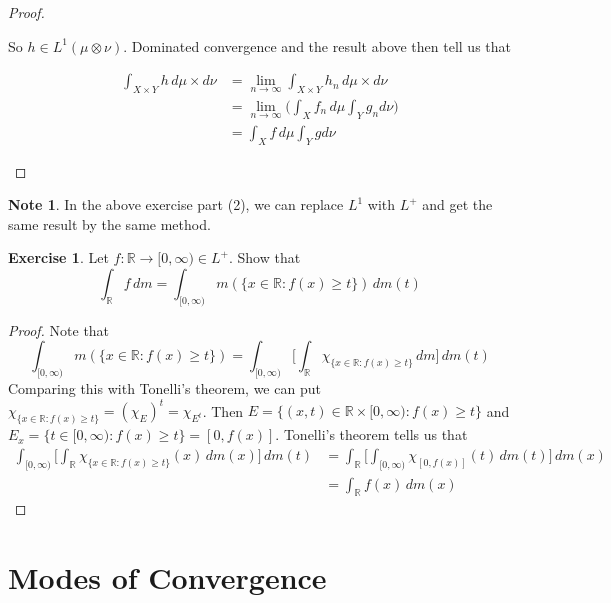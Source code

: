 \documentclass{book}
\theoremstyle{definition}
\newtheorem{note}[definition]{Note}
\newtheorem{ex}[definition]{Exercise}
\newcommand{\R}{\mathbb{R}}
\newcommand{\lex}[1]{\label{ex:#1}}
\DeclareMathOperator*{\0}{\mbf{0}}
\DeclareMathOperator*{\1}{\mbf{1}}
\newcommand{\limn}{\lim \limits_{n \rightarrow \infty}}
\newcommand{\Rg}{[0,\infty)}
\newcommand{\dmu}{\, d \mu}
\newcommand{\dm}{\, d m}
\begin{document}
\begin{proof}
\begin{enumerate}
			So $h \in L^1(\mu \otimes \nu)$. Dominated convergence and the result above then tell us that 
			
			\begin{align*}
				\int_{X \times Y} h \dmu \times d\nu 
				&= \limn \int_{X \times Y} h_n \dmu \times d\nu \\
				&= \limn \bigg( \int_X f_n \dmu \int_Y g_n d\nu \bigg)\\
				&= \int_X f \dmu \int_Y g d\nu
			\end{align*}
			
		\end{enumerate}
	\end{proof}
	
	\begin{note}
		In the above exercise part (2), we can replace $L^1$ with $L^+$ and get the same result by the same method.
	\end{note}
	
	\begin{ex} \lex{00000} 
		Let $f:\R \rightarrow \Rg \in L^+$. Show that $$\int_{\R}f\dm = \int_{\Rg}m(\{x \in \R: f(x) \geq t\}) \dm(t)$$
	\end{ex}
	
	\begin{proof}
		Note that $$\int_{\Rg}m(\{x \in \R: f(x) \geq t\}) = \int_{\Rg} \bigg[\int_{\R} \chi_{\{x \in \R: f(x) \geq t\}}\dm \bigg]\dm(t)$$
		Comparing this with Tonelli's theorem, we can put $\chi_{\{x \in \R: f(x) \geq t\}} = (\chi_{E})^t = \chi_{E^t}$. Then $E = \{(x,t) \in \R \times \Rg: f(x) \geq t\}$ and $E_x = \{t \in \Rg: f(x) \geq t\} = [0,f(x)]$. Tonelli's theorem tells us that 
		\begin{align*}
			\int_{\Rg} \bigg[\int_{\R} \chi_{\{x \in \R: f(x) \geq t\}}(x) \dm(x) \bigg]\dm(t)
			&= \int_{\R} \bigg[ \int_{\Rg} \chi_{[0,f(x)]}(t) \dm(t) \bigg] \dm(x)\\
			&= \int_{\R} f(x) \dm(x)
		\end{align*} 
	\end{proof}
	
	
	
	
	
	
	
	
	
	
	
	
	
	
	\newpage
	\section{Modes of Convergence}
	
\end{document}
